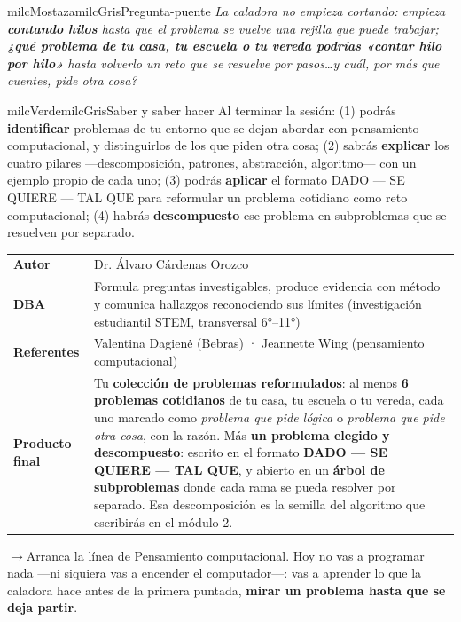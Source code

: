 \documentclass[11pt,letterpaper]{article}
\newcommand{\puente}[1]{%
  \begin{puentebox}%
    \textcolor{milcGradeDark}{$\rightarrow$}\hspace{2mm}#1%
  \end{puentebox}%
}
\begin{document}
\begin{softbox}{milcMostaza}{milcGris}{Pregunta-puente}
\textit{La caladora no empieza cortando: empieza \textbf{contando hilos} hasta que el problema se vuelve una rejilla que puede trabajar; \textbf{¿qué problema de tu casa, tu escuela o tu vereda podrías «contar hilo por hilo»} hasta volverlo un reto que se resuelve por pasos\ldots y cuál, por más que cuentes, pide otra cosa?}
\end{softbox}

\begin{softbox}{milcVerde}{milcGris}{Saber y saber hacer}
Al terminar la sesión: (1) podrás \textbf{identificar} problemas de tu entorno que se dejan abordar con pensamiento computacional, y distinguirlos de los que piden otra cosa; (2) sabrás \textbf{explicar} los cuatro pilares ---descomposición, patrones, abstracción, algoritmo--- con un ejemplo propio de cada uno; (3) podrás \textbf{aplicar} el formato DADO --- SE QUIERE --- TAL QUE para reformular un problema cotidiano como reto computacional; (4) habrás \textbf{descompuesto} ese problema en subproblemas que se resuelven por separado.
\end{softbox}



\small
\begin{tabularx}{\textwidth}{>{\bfseries}p{3.0cm}Y}
Autor & Dr. Álvaro Cárdenas Orozco\\
DBA & Formula preguntas investigables, produce evidencia con método y comunica hallazgos reconociendo sus límites (investigación estudiantil STEM, transversal 6°--11°)\\
Referentes & Valentina Dagienė (Bebras) · Jeannette Wing (pensamiento computacional)\\
Producto final & Tu \textbf{colección de problemas reformulados}: al menos \textbf{6 problemas cotidianos} de tu casa, tu escuela o tu vereda, cada uno marcado como \emph{problema que pide lógica} o \emph{problema que pide otra cosa}, con la razón. Más \textbf{un problema elegido y descompuesto}: escrito en el formato \textbf{DADO --- SE QUIERE --- TAL QUE}, y abierto en un \textbf{árbol de subproblemas} donde cada rama se pueda resolver por separado. Esa descomposición es la semilla del algoritmo que escribirás en el módulo 2.\\
\end{tabularx}
\normalsize

\puente{Arranca la línea de Pensamiento computacional. Hoy no vas a programar nada ---ni siquiera vas a encender el computador---: vas a aprender lo que la caladora hace antes de la primera puntada, \textbf{mirar un problema hasta que se deja partir}.}
\end{document}
